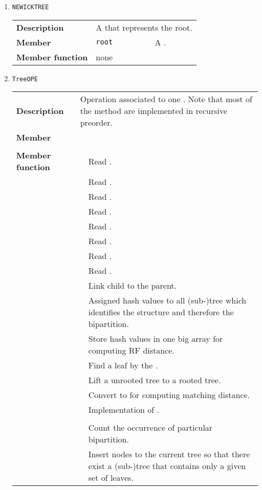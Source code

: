 \documentclass[11pt,a4paper]{article}
\newcommand{\myuline}[1]{%
	\uline{\phantom{#1}}%
	\llap{\contour{white}{#1}}%
}
\newcommand{\mrref}[1]{\texttt{#1}\label{#1}}
\newcommand{\mmemref}[2]{\texttt{#1}\label{#2#1}}
\newcommand{\rref}[1]{\hyperref[#1]{\textcolor{blue}{\myuline{\texttt{#1}}}}}
\newcommand{\tref}[2]{\hyperref[#2]{\textcolor{blue}{\myuline{\texttt{#1}}}}}
\newcommand{\memref}[2]{\hyperref[#2#1]{\textcolor{blue}{\myuline{#2::\texttt{#1}}}}}
\theoremstyle{definition}
\theoremstyle{definition}
\numberwithin{equation}{section}
\begin{document}
\begin{enumerate}
		
		\item \mrref{NEWICKTREE}
		
			\begin{tabular}{>{\bfseries}lp{}p{}}
				Description & \multicolumn{2}{p{0.6\textwidth}}{A \rref{NEWICKNODE} that represents the root.} \\
				Member & \mmemref{root}{NEWICKTREE}  & A \rref{NEWICKNODE}.\\
				Member function& none  &  \\
			\end{tabular}

		
		\item \mrref{TreeOPE}
		
			\begin{tabular}{>{\bfseries}lp{}p{}}
				Description & \multicolumn{2}{p{0.6\textwidth}}{Operation associated to one \rref{NEWICKTREE}. Note that most of the method are implemented in recursive preorder.} \\
				Member &   & \\
				&   &\\
				Member function& \rref{loadnewicktree} &  Read \rref{NEWICKTREE}.\\
				& \rref{loadnewicktree2} & Read \rref{NEWICKTREE}.\\
				& \rref{floadnewicktree} & Read \rref{NEWICKTREE}.\\
				& \rref{loadnode} & Read \rref{NEWICKTREE}.\\
				& \rref{loadleaf} & Read \rref{NEWICKTREE}.\\
				& \rref{parsetree} & Read \rref{NEWICKTREE}.\\
				& \rref{parsenode} & Read \rref{NEWICKTREE}.\\
				& \rref{parseleaf} & Read \rref{NEWICKTREE}.\\		
				& \rref{addchild} & Link child to the parent.\\
				& \tref{dfs\_compute\_hash}{dfscomputehash}  &  Assigned hash values to all (sub-)tree which identifies the structure and therefore the bipartition.\\
				& \rref{bipart} & Store hash values in one big array for computing RF distance.\\
				& \rref{findleaf} & Find a leaf by the \memref{label}{NEWICKNODE}.\\
				& \rref{normalizedTree} & Lift a unrooted tree to a rooted tree.\\
				& \rref{newick2lcbb} & Convert \rref{NEWICKTREE} to \rref{Ptree} for computing matching distance.\\
				& \rref{newick2ptree} & Implementation of \rref{newick2lcbb}.\\
				& \rref{sumofdegree} & \\
				& \rref{bipartcount} & Count the occurrence of particular bipartition.\\
				& \rref{Addbipart} & Insert nodes to the current tree so that there exist a (sub-)tree that contains only a given set of leaves.
				

\end{tabular}
\end{enumerate}
\end{document}
